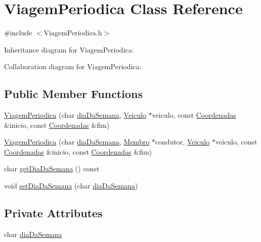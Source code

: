 \hypertarget{class_viagem_periodica}{\section{Viagem\+Periodica Class Reference}
\label{class_viagem_periodica}
}


{\ttfamily \#include $<$Viagem\+Periodica.\+h$>$}



Inheritance diagram for Viagem\+Periodica\+:


Collaboration diagram for Viagem\+Periodica\+:
\subsection*{Public Member Functions}
\begin{DoxyCompactItemize}
\item 
\hyperlink{class_viagem_periodica_aac7574ed67f67dad6d16751c2d024670}{Viagem\+Periodica} (char \hyperlink{class_viagem_periodica_ac53255ef9f3e6d862e2ac803d7e45206}{dia\+Da\+Semana}, \hyperlink{class_veiculo}{Veiculo} $\ast$veiculo, const \hyperlink{class_coordenadas}{Coordenadas} \&inicio, const \hyperlink{class_coordenadas}{Coordenadas} \&fim)
\item 
\hyperlink{class_viagem_periodica_a13fc61d10fe1d8f3ced8e7f9557c2553}{Viagem\+Periodica} (char \hyperlink{class_viagem_periodica_ac53255ef9f3e6d862e2ac803d7e45206}{dia\+Da\+Semana}, \hyperlink{class_membro}{Membro} $\ast$condutor, \hyperlink{class_veiculo}{Veiculo} $\ast$veiculo, const \hyperlink{class_coordenadas}{Coordenadas} \&inicio, const \hyperlink{class_coordenadas}{Coordenadas} \&fim)
\item 
char \hyperlink{class_viagem_periodica_a18ccdd2f58dd4fbf3dc95e1927a61af7}{get\+Dia\+Da\+Semana} () const 
\item 
void \hyperlink{class_viagem_periodica_a1351abcca608d827c5c4eb7ba2f45e14}{set\+Dia\+Da\+Semana} (char \hyperlink{class_viagem_periodica_ac53255ef9f3e6d862e2ac803d7e45206}{dia\+Da\+Semana})
\end{DoxyCompactItemize}
\subsection*{Private Attributes}
\begin{DoxyCompactItemize}
\item 
char \hyperlink{class_viagem_periodica_ac53255ef9f3e6d862e2ac803d7e45206}{dia\+Da\+Semana}
\end{DoxyCompactItemize}
